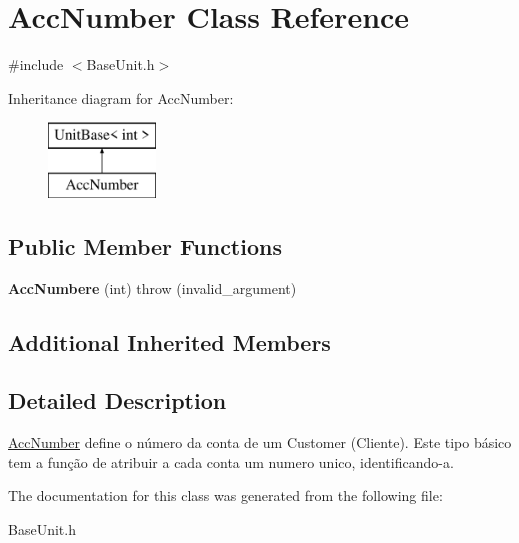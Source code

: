 \hypertarget{classAccNumber}{\section{Acc\-Number Class Reference}
\label{classAccNumber}
}


{\ttfamily \#include $<$Base\-Unit.\-h$>$}

Inheritance diagram for Acc\-Number\-:\begin{figure}[H]
\begin{center}
\leavevmode
\includegraphics[height=2.000000cm]{classAccNumber}
\end{center}
\end{figure}
\subsection*{Public Member Functions}
\begin{DoxyCompactItemize}
\item 
\hypertarget{classAccNumber_a135cf83c281ec3ecda84de008207529d}{{\bfseries Acc\-Numbere} (int)  throw (invalid\-\_\-argument)}\label{classAccNumber_a135cf83c281ec3ecda84de008207529d}

\end{DoxyCompactItemize}
\subsection*{Additional Inherited Members}


\subsection{Detailed Description}
\hyperlink{classAccNumber}{Acc\-Number} define o número da conta de um Customer (Cliente). Este tipo básico tem a função de atribuir a cada conta um numero unico, identificando-\/a. 

The documentation for this class was generated from the following file\-:\begin{DoxyCompactItemize}
\item 
Base\-Unit.\-h\end{DoxyCompactItemize}
